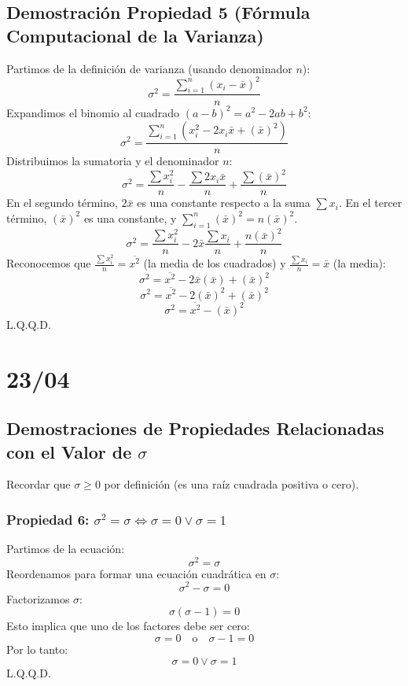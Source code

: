 \documentclass[12pt, letterpaper]{article}
\begin{document}
\subsection{Demostración Propiedad 5 (Fórmula Computacional de la Varianza)}
Partimos de la definición de varianza (usando denominador $n$):
\[\sigma^2=\frac{\sum_{i=1}^{n} (x_i-\bar{x})^2}{n}\]
Expandimos el binomio al cuadrado $(a-b)^2 = a^2 - 2ab + b^2$:
\[\sigma^2=\frac{\sum_{i=1}^{n} (x_i^2 - 2x_i\bar{x} + (\bar{x})^2)}{n}\]
Distribuimos la sumatoria y el denominador $n$:
\[\sigma^2=\frac{\sum x_i^2}{n} - \frac{\sum 2x_i\bar{x}}{n} + \frac{\sum (\bar{x})^2}{n}\]
En el segundo término, $2\bar{x}$ es una constante respecto a la suma $\sum x_i$. En el tercer término, $(\bar{x})^2$ es una constante, y $\sum_{i=1}^{n} (\bar{x})^2 = n(\bar{x})^2$.
\[\sigma^2=\frac{\sum x_i^2}{n} - 2\bar{x} \frac{\sum x_i}{n} + \frac{n(\bar{x})^2}{n}\]
Reconocemos que $\frac{\sum x_i^2}{n} = \overline{x^2}$ (la media de los cuadrados) y $\frac{\sum x_i}{n} = \bar{x}$ (la media):
\[\sigma^2=\overline{x^2} - 2\bar{x} (\bar{x}) + (\bar{x})^2\]
\[\sigma^2=\overline{x^2} - 2(\bar{x})^2 + (\bar{x})^2\]
\[\sigma^2=\overline{x^2} - (\bar{x})^2\]
L.Q.Q.D.
\newpage

    \section{23/04}
        \subsection{Demostraciones de Propiedades Relacionadas con el Valor de $\sigma$}
            Recordar que $\sigma \ge 0$ por definición (es una raíz cuadrada positiva o cero).

            \subsubsection{Propiedad 6: $\sigma^2 = \sigma \iff \sigma=0 \vee \sigma=1$}
                Partimos de la ecuación:
                \[\sigma^2=\sigma \]
                Reordenamos para formar una ecuación cuadrática en $\sigma$:
                \[\sigma^2-\sigma=0 \]
                Factorizamos $\sigma$:
                \[\sigma(\sigma-1)=0 \]
                Esto implica que uno de los factores debe ser cero:
                \[\sigma=0 \quad \text{o} \quad \sigma-1=0 \]
                Por lo tanto:
                \[\sigma=0 \vee \sigma=1 \]
                L.Q.Q.D.
\end{document}
